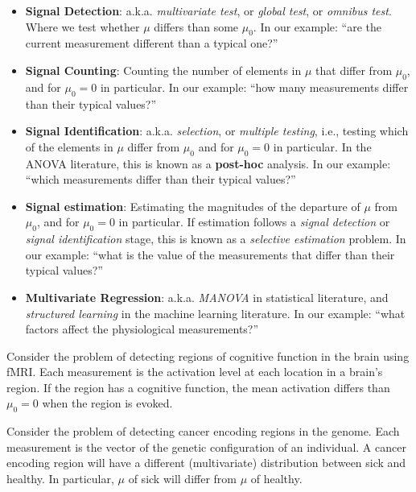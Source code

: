 \documentclass[]{book}
\theoremstyle{definition}
\theoremstyle{definition}
\theoremstyle{definition}
\theoremstyle{remark}
\let\BeginKnitrBlock\begin \let\EndKnitrBlock\end
\begin{document}
\begin{itemize}
\item
  \textbf{Signal Detection}:
  a.k.a. \emph{multivariate test}, or \emph{global test}, or \emph{omnibus test}.
  Where we test whether \(\mu\) differs than some \(\mu_0\).
  In our example: ``are the current measurement different than a typical one?''
\item
  \textbf{Signal Counting}:
  Counting the number of elements in \(\mu\) that differ from \(\mu_0\), and for \(\mu_0=0\) in particular.
  In our example: ``how many measurements differ than their typical values?''
\item
  \textbf{Signal Identification}:
  a.k.a. \emph{selection}, or \emph{multiple testing}, i.e., testing which of the elements in \(\mu\) differ from \(\mu_0\) and for \(\mu_0=0\) in particular.
  In the ANOVA literature, this is known as a \textbf{post-hoc} analysis.
  In our example: ``which measurements differ than their typical values?''
\item
  \textbf{Signal estimation}:
  Estimating the magnitudes of the departure of \(\mu\) from \(\mu_0\), and for \(\mu_0=0\) in particular.
  If estimation follows a \emph{signal detection} or \emph{signal identification} stage, this is known as a \emph{selective estimation} problem.
  In our example: ``what is the value of the measurements that differ than their typical values?''
\item
  \textbf{Multivariate Regression}:
  a.k.a. \emph{MANOVA} in statistical literature, and \emph{structured learning} in the machine learning literature.
  In our example: ``what factors affect the physiological measurements?''
\end{itemize}

\BeginKnitrBlock{example}
\protect\hypertarget{exm:brain-imaging}{}{\label{exm:brain-imaging} }Consider the problem of detecting regions of cognitive function in the brain using fMRI.
Each measurement is the activation level at each location in a brain's region.
If the region has a cognitive function, the mean activation differs than \(\mu_0=0\) when the region is evoked.
\EndKnitrBlock{example}

\BeginKnitrBlock{example}
\protect\hypertarget{exm:genetics}{}{\label{exm:genetics} }Consider the problem of detecting cancer encoding regions in the genome.
Each measurement is the vector of the genetic configuration of an individual.
A cancer encoding region will have a different (multivariate) distribution between sick and healthy.
In particular, \(\mu\) of sick will differ from \(\mu\) of healthy.
\EndKnitrBlock{example}
\end{document}
